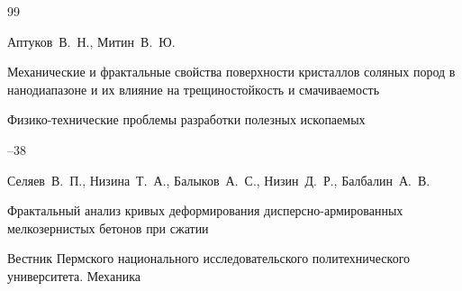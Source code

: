 \begin{thebibliography}{99}


















\by Аптуков~В.~Н., Митин~В.~Ю.

\paper Механические и фрактальные свойства поверхности кристаллов соляных пород в нанодиапазоне и их влияние на трещиностойкость и смачиваемость 

\jour Физико-технические проблемы разработки полезных ископаемых



--38

















\by Селяев~В.~П., Низина~Т.~А., Балыков~А.~С., Низин~Д.~Р., Балбалин~А.~В.

\paper Фрактальный анализ кривых деформирования дисперсно-армированных мелкозернистых бетонов при сжатии 

\jour Вестник Пермского национального исследовательского политехнического университета. Механика




\end{thebibliography}
